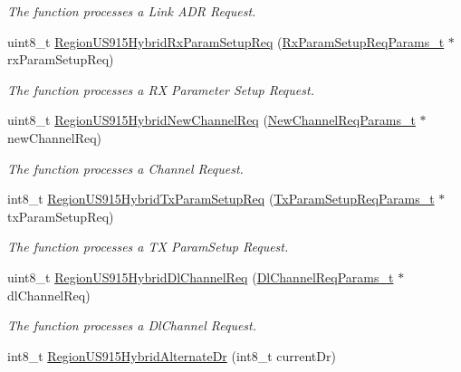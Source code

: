 \begin{DoxyCompactItemize}
\begin{DoxyCompactList}\small\item\em The function processes a Link A\+DR Request. \end{DoxyCompactList}\item 
uint8\+\_\+t \mbox{\hyperlink{group___r_e_g_i_o_n_u_s915_h_y_b_gaaee00f3fbfae1f41b0eec05d8b564177}{Region\+U\+S915\+Hybrid\+Rx\+Param\+Setup\+Req}} (\mbox{\hyperlink{group___r_e_g_i_o_n_ga7165f282c670c728c36d534df2285157}{Rx\+Param\+Setup\+Req\+Params\+\_\+t}} $\ast$rx\+Param\+Setup\+Req)
\begin{DoxyCompactList}\small\item\em The function processes a RX Parameter Setup Request. \end{DoxyCompactList}\item 
uint8\+\_\+t \mbox{\hyperlink{group___r_e_g_i_o_n_u_s915_h_y_b_ga8555b0827350263310c34afbb060842e}{Region\+U\+S915\+Hybrid\+New\+Channel\+Req}} (\mbox{\hyperlink{group___r_e_g_i_o_n_gae2abcdb6dbb843c9faf5fd3009eca9d6}{New\+Channel\+Req\+Params\+\_\+t}} $\ast$new\+Channel\+Req)
\begin{DoxyCompactList}\small\item\em The function processes a Channel Request. \end{DoxyCompactList}\item 
int8\+\_\+t \mbox{\hyperlink{group___r_e_g_i_o_n_u_s915_h_y_b_gaea3f732a576b39e66791fb8e319b39a9}{Region\+U\+S915\+Hybrid\+Tx\+Param\+Setup\+Req}} (\mbox{\hyperlink{group___r_e_g_i_o_n_ga26836ef2996e70410e42ef471073f855}{Tx\+Param\+Setup\+Req\+Params\+\_\+t}} $\ast$tx\+Param\+Setup\+Req)
\begin{DoxyCompactList}\small\item\em The function processes a TX Param\+Setup Request. \end{DoxyCompactList}\item 
uint8\+\_\+t \mbox{\hyperlink{group___r_e_g_i_o_n_u_s915_h_y_b_ga0656307062a414233d72e9cf68e5763c}{Region\+U\+S915\+Hybrid\+Dl\+Channel\+Req}} (\mbox{\hyperlink{group___r_e_g_i_o_n_gae0d608ff1f8ea0a430e4f9a4c38ec7f3}{Dl\+Channel\+Req\+Params\+\_\+t}} $\ast$dl\+Channel\+Req)
\begin{DoxyCompactList}\small\item\em The function processes a Dl\+Channel Request. \end{DoxyCompactList}\item 
int8\+\_\+t \mbox{\hyperlink{group___r_e_g_i_o_n_u_s915_h_y_b_gac169f8bcedf244520310b47ba0877a0c}{Region\+U\+S915\+Hybrid\+Alternate\+Dr}} (int8\+\_\+t current\+Dr)

\end{DoxyCompactItemize}
